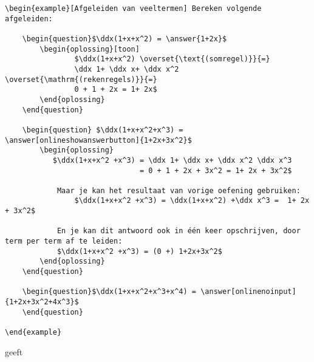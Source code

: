 \documentclass{ximera}
\begin{document}
{\footnotesize
\begin{verbatim}
\begin{example}[Afgeleiden van veeltermen] Bereken volgende afgeleiden:

	\begin{question}$\ddx(1+x+x^2) = \answer{1+2x}$ 
		\begin{oplossing}[toon] 
                $\ddx(1+x+x^2) \overset{\text{(somregel)}}{=} 
                \ddx 1+ \ddx x+ \ddx x^2 \overset{\mathrm{(rekenregels)}}{=} 
                0 + 1 + 2x = 1+ 2x$
        \end{oplossing}
	\end{question}

	\begin{question} $\ddx(1+x+x^2+x^3) = \answer[onlineshowanswerbutton]{1+2x+3x^2}$ 
		\begin{oplossing} 
           $\ddx(1+x+x^2 +x^3) = \ddx 1+ \ddx x+ \ddx x^2 \ddx x^3 
                               = 0 + 1 + 2x + 3x^2 = 1+ 2x + 3x^2$
			
			Maar je kan het resultaat van vorige oefening gebruiken: 
                $\ddx(1+x+x^2 +x^3) = \ddx(1+x+x^2) +\ddx x^3 =  1+ 2x + 3x^2$
			
			En je kan dit antwoord ook in één keer opschrijven, door term per term af te leiden:
			$\ddx(1+x+x^2 +x^3) = (0 +) 1+2x+3x^2$
		\end{oplossing}	
	\end{question}
    
	\begin{question}$\ddx(1+x+x^2+x^3+x^4) = \answer[onlinenoinput]{1+2x+3x^2+4x^3}$ 
    \end{question}
    
\end{example}

\end{verbatim}
}

geeft 
\end{document}
